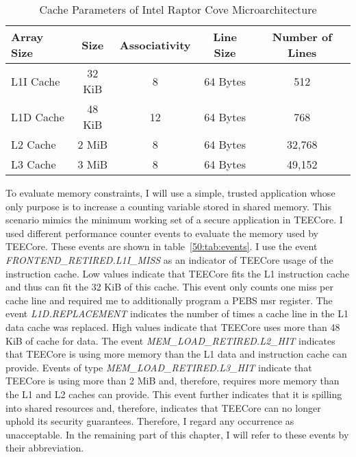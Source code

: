 \begin{table}[ht]
  \centering
  \begin{tabular}{ |l||c|c|c|c| }
    \hline
    Array Size & Size   & Associativity   & Line Size & Number of Lines \\
    \hline
    L1I Cache  & 32 KiB & 8               & 64 Bytes  & 512             \\
    L1D Cache  & 48 KiB & 12\footnotemark & 64 Bytes  & 768             \\
    L2 Cache   & 2 MiB  & 8               & 64 Bytes  & 32,768          \\
    L3 Cache   & 3 MiB  & 8               & 64 Bytes  & 49,152          \\
    \hline
  \end{tabular}
  \caption{Cache Parameters of Intel Raptor Cove Microarchitecture}
  \label{50:tab:cache_size}
\end{table}

To evaluate memory constraints, I will use a simple, trusted application whose
only purpose is to increase a counting variable stored in shared memory. This
scenario mimics the minimum working set of a secure application in TEECore. I
used different performance counter events to evaluate the memory used by
TEECore. These events are shown in table~\ref{50:tab:events}. I use the event
\textit{FRONTEND\_RETIRED.L1I\_MISS} as an indicator of TEECore usage of the
instruction cache. Low values indicate that TEECore fits the L1 instruction
cache and thus can fit the 32 KiB of this cache. This event only counts one miss
per cache line and required me to additionally program a PEBS \gls{msr}
register. The event \textit{L1D.REPLACEMENT} indicates the number of times a
cache line in the L1 data cache was replaced. High values indicate that TEECore
uses more than 48 KiB of cache for data. The event
\textit{MEM\_LOAD\_RETIRED.L2\_HIT} indicates that TEECore is using more memory
than the L1 data and instruction cache can provide. Events of type
\textit{MEM\_LOAD\_RETIRED.L3\_HIT} indicate that TEECore is using more than 2
MiB and, therefore, requires more memory than the L1 and L2 caches can provide.
This event further indicates that it is spilling into shared resources and,
therefore, indicates that TEECore can no longer uphold its security guarantees.
Therefore, I regard any occurrence as unacceptable. In the remaining part of
this chapter, I will refer to these events by their abbreviation.

